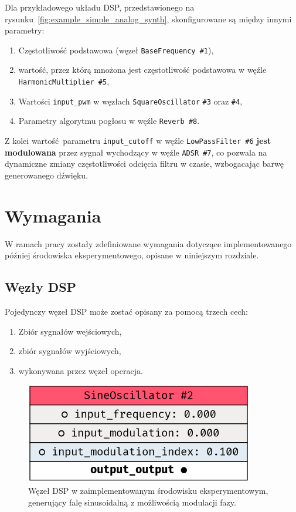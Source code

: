 \noindent
Dla przykładowego układu DSP, przedstawionego na rysunku~\ref{fig:example_simple_analog_synth},
skonfigurowane są między innymi parametry:

\begin{enumerate}
  \item Częstotliwość podstawowa (węzeł \texttt{BaseFrequency \#1}),
  \item wartość, przez którą mnożona jest częstotliwość podstawowa w węźle \texttt{HarmonicMultiplier \#5},
  \item Wartości \texttt{input\_pwm} w węzłach \texttt{SquareOscillator} \texttt{\#3} oraz \texttt{\#4},
  \item Parametry algorytmu pogłosu w węźle \texttt{Reverb \#8}.
\end{enumerate}

\noindent
Z kolei wartość parametru \texttt{input\_cutoff} w węźle \texttt{LowPassFilter \#6} \textbf{jest modulowana}
przez sygnał wychodzący w węźle \texttt{ADSR \#7}, co pozwala na dynamiczne zmiany
częstotliwości odcięcia filtru w czasie, wzbogacając barwę generowanego dźwięku.

\section{Wymagania}\label{sec:requirements}

W ramach pracy zostały zdefiniowane wymagania dotyczące implementowanego później środowiska eksperymentowego,
opisane w niniejszym rozdziale.

\subsection{Węzły DSP}

Pojedynczy węzeł DSP może zostać opisany za pomocą trzech cech:

\begin{enumerate}
  \item Zbiór sygnałów wejściowych,
  \item zbiór sygnałów wyjściowych,
  \item wykonywana przez węzeł operacja.
\end{enumerate}


\begin{figure}[H]\label{fig:example_sine_node}
    \centering
    \includegraphics[width=0.4\linewidth]{rys02/example_sine_node.png}
    \caption{
      Węzeł DSP w zaimplementowanym środowisku eksperymentowym, generujący falę sinusoidalną z możliwością modulacji fazy.
    }
\end{figure}

